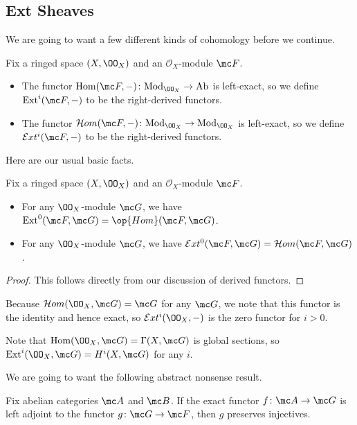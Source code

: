 \documentclass[../notes.tex]{subfiles}
\begin{document}
\subsection{Ext Sheaves}
We are going to want a few different kinds of cohomology before we continue.
\begin{definition}[Ext]
	Fix a ringed space $(X,\OO_X)$ and an $\mathcal O_X$-module $\mc F$.
	\begin{itemize}
		\item The functor $\mathrm{Hom}(\mc F,-)\colon\mathrm{Mod}_{\OO_X}\to\mathrm{Ab}$ is left-exact, so we define $\mathrm{Ext}^i(\mc F,-)$ to be the right-derived functors.
		\item The functor $\mathcal Hom(\mc F,-)\colon\mathrm{Mod}_{\OO_X}\to\mathrm{Mod}_{\OO_X}$ is left-exact, so we define $\mathcal Ext^i(\mc F,-)$ to be the right-derived functors.
	\end{itemize}
\end{definition}
Here are our usual basic facts.
\begin{lemma}
	Fix a ringed space $(X,\OO_X)$ and an $\mathcal O_X$-module $\mc F$.
	\begin{itemize}
		\item For any $\OO_X$-module $\mc G$, we have $\mathrm{Ext}^0(\mc F,\mc G)=\op{Hom}(\mc F,\mc G)$.
		\item For any $\OO_X$-module $\mc G$, we have $\mathcal Ext^0(\mc F,\mc G)=\mathcal Hom(\mc F,\mc G)$.
	\end{itemize}
\end{lemma}
\begin{proof}
	This follows directly from our discussion of derived functors.
\end{proof}
\begin{example}
	Because $\mathcal Hom(\OO_X,\mc G)=\mc G$ for any $\mc G$, we note that this functor is the identity and hence exact, so $\mathcal Ext^i(\OO_X,-)$ is the zero functor for $i>0$.
\end{example}
\begin{example}
	Note that $\mathrm{Hom}(\OO_X,\mc G)=\Gamma(X,\mc G)$ is global sections, so $\mathrm{Ext}^i(\OO_X,\mc G)=H^i(X,\mc G)$ for any $i$.
\end{example}
We are going to want the following abstract nonsense result.
\begin{lemma} \label{lem:exact-left-adj}
	Fix abelian categories $\mc A$ and $\mc B$. If the exact functor $f\colon\mc A\to\mc G$ is left adjoint to the functor $g\colon\mc G\to\mc F$, then $g$ preserves injectives.
\end{lemma}
\end{document}
